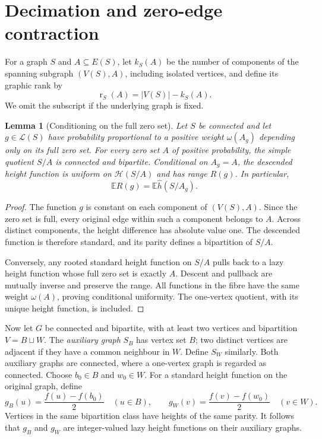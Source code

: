 \documentclass[11pt,reqno]{amsart}
\newtheorem{lemma}[theorem]{Lemma}
\theoremstyle{remark}
\numberwithin{equation}{section}
\newcommand{\E}{\mathbb E}
\newcommand{\HH}{\mathcal H}
\newcommand{\LL}{\mathcal L}
\DeclareMathOperator{\rk}{r}
\begin{document}
\section{Decimation and zero-edge contraction}\label{sec:decimation}

For a graph $S$ and $A\subseteq E(S)$, let $k_S(A)$ be the number of
components of the spanning subgraph $(V(S),A)$, including isolated
vertices, and define its graphic rank by
\[
 \rk_S(A)=|V(S)|-k_S(A).
\]
We omit the subscript if the underlying graph is fixed.

\begin{lemma}[Conditioning on the full zero set]\label{lem:fullzero}
Let $S$ be connected and let $g\in\LL(S)$ have probability proportional
to a positive weight $\omega(A_g)$ depending only on its full zero set.
For every zero set $A$ of positive probability, the simple quotient $S/A$
is connected and bipartite. Conditional on $A_g=A$, the descended height
function is uniform on $\HH(S/A)$ and has range $R(g)$. In particular,
\begin{equation}\label{eq:quotient-average}
 \E R(g)=\E\widehat h(S/A_g).
\end{equation}
\end{lemma}

\begin{proof}
The function $g$ is constant on each component of $(V(S),A)$.
Since the zero set is full, every original edge within such a component
belongs to $A$. Across distinct components, the height difference has
absolute value one. The descended function is therefore standard, and
its parity defines a bipartition of $S/A$.

Conversely, any rooted standard height function on $S/A$ pulls back to
a lazy height function whose full zero set is exactly $A$. Descent and
pullback are mutually inverse and preserve the range. All functions in
the fibre have the same weight $\omega(A)$, proving conditional uniformity. The
one-vertex quotient, with its unique height function, is included.
\end{proof}

Now let $G$ be connected and bipartite, with at least two vertices and
bipartition $V=B\sqcup W$. The \emph{auxiliary graph} $S_B$ has vertex
set $B$; two distinct vertices are adjacent if they have a common neighbour
in $W$. Define $S_W$ similarly. Both auxiliary graphs are connected,
where a one-vertex graph is regarded as connected. Choose $b_0\in B$ and
$w_0\in W$. For a standard height function on the original graph, define
\[
 g_B(u)=\frac{f(u)-f(b_0)}2\quad(u\in B),\qquad
 g_W(v)=\frac{f(v)-f(w_0)}2\quad(v\in W).
\]
Vertices in the same bipartition class have heights of the same parity.
It follows that $g_B$ and $g_W$ are integer-valued lazy height functions
on their auxiliary graphs.
\end{document}
